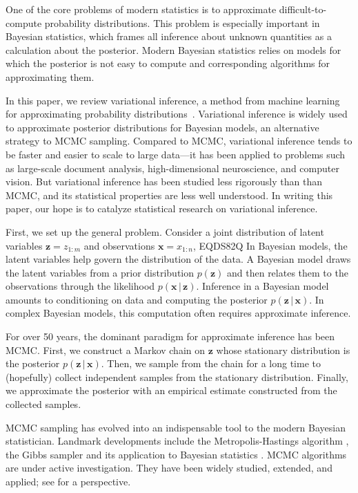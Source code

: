 \documentclass{article}
\begin{document}
One of the core problems of modern statistics is to approximate
difficult-to-compute probability distributions.  This problem is
especially important in Bayesian statistics, which frames all
inference about unknown quantities as a calculation about the
posterior.  Modern Bayesian statistics relies on models for which the
posterior is not easy to compute and corresponding algorithms for
approximating them.

In this paper, we review variational inference, a method from machine
learning for approximating probability
distributions~\citep{Jordan:1999,wainwright2008graphical}.
Variational inference is widely used to approximate posterior
distributions for Bayesian models, an alternative strategy to
\gls{MCMC} sampling.  Compared to \gls{MCMC}, variational inference
tends to be faster and easier to scale to large data---it has been
applied to problems such as large-scale document analysis,
high-dimensional neuroscience, and computer vision.  But variational
inference has been studied less rigorously than than \gls{MCMC}, and
its statistical properties are less well understood.  In writing this
paper, our hope is to catalyze statistical research on variational
inference.

First, we set up the general problem.  Consider a joint distribution
of latent variables ${\mathbf{z}} = z_{1:m}$ and observations ${\mathbf{x}} = x_{1:n}$,
EQDS82Q
In Bayesian models, the latent variables help govern the distribution
of the data.  A Bayesian model draws the latent variables from a prior
distribution $p({\mathbf{z}})$ and then relates them to the observations
through the likelihood $p({\mathbf{x}} {\,\vert\,} {\mathbf{z}})$.  Inference in a Bayesian model
amounts to conditioning on data and computing the posterior
$p({\mathbf{z}} {\,\vert\,} {\mathbf{x}})$.  In complex Bayesian models, this computation often
requires approximate inference.

For over 50 years, the dominant paradigm for approximate inference has
been \gls{MCMC}. First, we construct a Markov chain on ${\mathbf{z}}$ whose
stationary distribution is the posterior $p({\mathbf{z}} {\,\vert\,} {\mathbf{x}})$.  Then, we
sample from the chain for a long time to (hopefully) collect
independent samples from the stationary distribution. Finally, we
approximate the posterior with an empirical estimate constructed from
the collected samples.

\gls{MCMC} sampling has evolved into an indispensable tool to the
modern Bayesian statistician. Landmark developments include the
Metropolis-Hastings algorithm \citep{Metropolis:1953,Hastings:1970},
the Gibbs sampler \citep{Geman:1984} and its application to Bayesian
statistics \citep{Gelfand:1990}. \gls{MCMC} algorithms are under
active investigation.  They have been widely studied, extended, and
applied; see \citet{Robert:2004} for a perspective.
\end{document}
